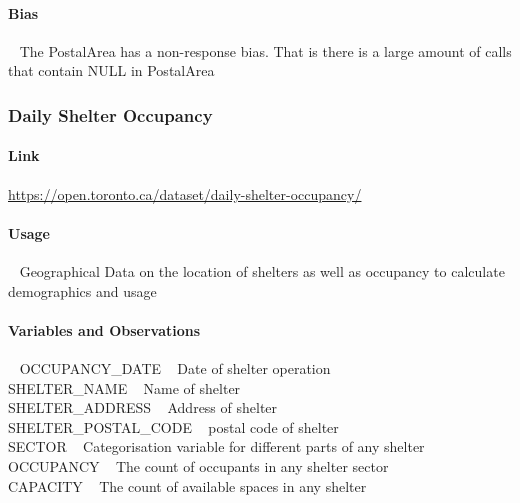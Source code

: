 \documentclass[
]{article}
\begin{document}
\hypertarget{bias}{%
\paragraph{Bias}\label{bias}}

~ The PostalArea has a non-response bias. That is there is a large
amount of calls that contain NULL in PostalArea

\hypertarget{daily-shelter-occupancy}{%
\subsubsection{Daily Shelter Occupancy}\label{daily-shelter-occupancy}}

\hypertarget{link}{%
\paragraph{Link}\label{link}}

\url{https://open.toronto.ca/dataset/daily-shelter-occupancy/}

\hypertarget{usage-1}{%
\paragraph{Usage}\label{usage-1}}

~ Geographical Data on the location of shelters as well as occupancy to
calculate demographics and usage

\hypertarget{variables-and-observations-1}{%
\paragraph{Variables and
Observations}\label{variables-and-observations-1}}

~ OCCUPANCY\_DATE ~ Date of shelter operation\\
\hspace*{0.333em} SHELTER\_NAME ~ Name of shelter\\
\hspace*{0.333em} SHELTER\_ADDRESS ~ Address of shelter\\
\hspace*{0.333em} SHELTER\_POSTAL\_CODE ~ postal code of shelter\\
\hspace*{0.333em} SECTOR ~ Categorisation variable for different parts
of any shelter\\
\hspace*{0.333em} OCCUPANCY ~ The count of occupants in any shelter
sector\\
\hspace*{0.333em} CAPACITY ~ The count of available spaces in any
shelter
\end{document}
